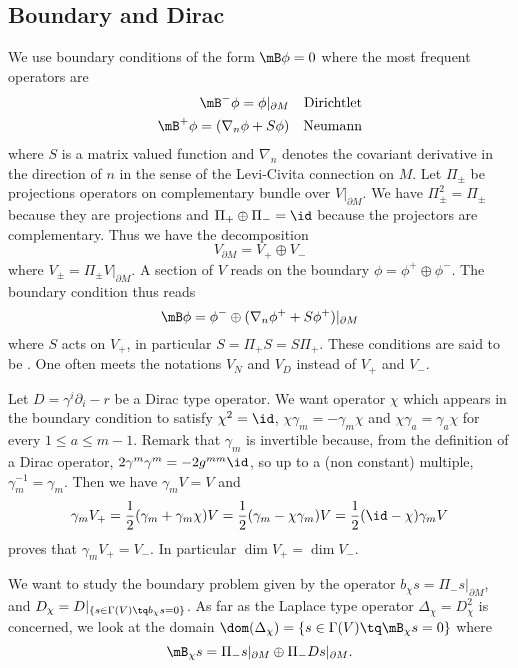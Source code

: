 \subsection{Boundary and Dirac}

We use boundary conditions of the form $\mB\phi=0$ where the most frequent operators are
\begin{align*}
		\mB^-\phi=\phi|_{\partial M}		&&\text{Dirichtlet}\\
		\mB^+\phi=(\nabla_n\phi+S\phi)		&&\text{Neumann}
\end{align*}
where $S$ is a matrix valued function and $\nabla_n$ denotes the covariant derivative in the direction of $n$ in the sense of the Levi-Civita connection on $M$. Let $\Pi_{\pm}$ be projections operators on complementary bundle over $V|_{\partial M}$. We have $\Pi_{\pm}^2=\Pi_{\pm}$ because they are projections and $\Pi_{+}\oplus\Pi_-=\id$ because the projectors are complementary. Thus we have the decomposition
\[
  V_{\partial M}=V_+\oplus V_-
\]
where $V_{\pm}=\Pi_{\pm}V|_{\partial M}$. A section of $V$ reads on the boundary $\phi=\phi^+\oplus\phi^-$. The boundary condition thus reads
\begin{equation}
\mB\phi=\phi^-\oplus(\nabla_n\phi^++S\phi^+)|_{\partial M}
\end{equation}
where $S$ acts on $V_+$, in particular $S=\Pi_+S=S\Pi_+$. These conditions are said to be . One often meets the notations $V_N$ and $V_D$ instead of $V_+$ and $V_-$.


Let $D=\gamma^i\partial_i-r$ be a Dirac type operator. We want operator $\chi$ which appears in the boundary condition to satisfy $\chi^2=\id$, $\chi\gamma_m=-\gamma_m\chi$ and $\chi\gamma_a=\gamma_a\chi$ for every $1\leq a\leq m-1$. Remark that $\gamma_m$ is invertible because, from the definition of a Dirac operator, $2\gamma^m\gamma^m=-2g^{mm}\id$, so up to a (non constant) multiple, $\gamma_m^{-1}=\gamma_m$. Then we have $\gamma_mV=V$ and
\[
  \gamma_mV_+=\frac{ 1 }{2}(\gamma_m+\gamma_m\chi)V=\frac{ 1 }{2}(\gamma_m-\chi\gamma_m)V=\frac{ 1 }{2}(\id-\chi)\gamma_mV
\]
proves that $\gamma_mV_+=V_-$. In particular $\dim V_+=\dim V_-$.

We want to study the boundary problem given by the operator $b_{\chi}s=\Pi_-s|_{\partial M}$, and $D_{\chi}=D|_{\{ s\in\Gamma(V)\tq b_{\chi}s=0 \}}$. As far as the Laplace type operator $\Delta_{\chi}=D_{\chi}^2$ is concerned, we look at the domain $\dom(\Delta_{\chi})=\{ s\in\Gamma(V)\tq \mB_{\chi}s=0 \}$ where
\begin{equation}
  \mB_{\chi}s=\Pi_-s|_{\partial M}\oplus\Pi_-Ds|_{\partial M}.
\end{equation}

